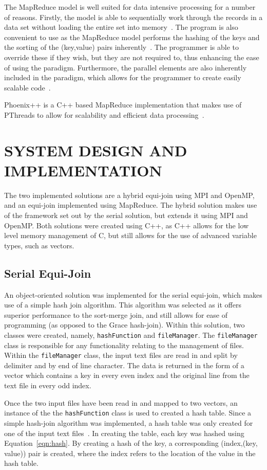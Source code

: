 \documentclass[12pt,twocolumn]{witseiepaper}
\begin{document}
The MapReduce model is well suited for data intensive processing for a number of reasons. Firstly, the model is able to sequentially work through the records in a data set without loading the entire set into memory~\cite{comparingMPIMapReduce}. The program is also convenient to use as the MapReduce model performs the hashing of the keys and the sorting of the (key,value) pairs inherently~\cite{phoenix}. The programmer is able to override these if they wish, but they are not required to, thus enhancing the ease of using the paradigm. Furthermore, the parallel elements are also inherently included in the paradigm, which allows for the programmer to create easily scalable code~\cite{comparingMPIMapReduce}. 

Phoenix++ is a C++ based MapReduce implementation that makes use of PThreads to allow for scalability and efficient data processing~\cite{phoenix}.

\section{SYSTEM DESIGN AND IMPLEMENTATION}
The two implemented solutions are a hybrid equi-join using MPI and OpenMP, and an equi-join implemented using MapReduce. The hybrid solution makes use of the framework set out by the serial solution, but extends it using MPI and OpenMP. Both solutions were created using C++, as C++ allows for the low level memory management of C, but still allows for the use of advanced variable types, such as vectors.

\subsection{Serial Equi-Join}
An object-oriented solution was implemented for the serial equi-join, which makes use of a simple hash join algorithm. This algorithm was selected as it offers superior performance to the sort-merge join, and still allows for ease of programming (as opposed to the Grace hash-join). Within this solution, two classes were created, namely, \texttt{hashFunction} and \texttt{fileManager}. The \texttt{fileManager} class is responsible for any functionality relating to the management of files. Within the \texttt{fileManager} class, the input text files are read in and split by delimiter and by end of line character. The data is returned in the form of a vector which contains a key in every even index and the original line from the text file in every odd index.

Once the two input files have been read in and mapped to two vectors, an instance of the the \texttt{hashFunction} class is used to created a hash table. Since a simple hash-join algorithm was implemented, a hash table was only created for one of the input text files~\cite{evaluating4JoinAlgorithms}. In creating the table, each key was hashed using Equation~\ref{eqn:hash}. By creating a hash of the key, a corresponding (index,(key, value)) pair is created, where the index refers to the location of the value in the hash table. 
\end{document}
